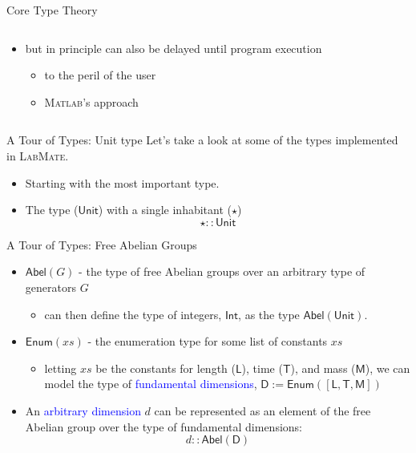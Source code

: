 \documentclass[]{beamer}
\newcommand{\keyword}[1]{\textcolor{blue}{#1}}
\newcommand{\lr}{\textsc{LabMate}}
\newcommand{\ma}{\textsc{Matlab}}
\newcommand{\Unit}{\mathsf{Unit}}
\newcommand{\Abel}{\mathsf{Abel}}
\newcommand{\Int}{\mathsf{Int}}
\newcommand{\Enum}{\mathsf{Enum}}
\newcommand{\LL}{\mathsf{L}}
\newcommand{\TT}{\mathsf{T}}
\newcommand{\MM}{\mathsf{M}}
\begin{document}
\begin{frame}{Core Type Theory}
\begin{columns}
\begin{column}{0.55\textwidth}
\begin{itemize}[<+->]
\begin{itemize}
        \item \lr{}'s approach
      \end{itemize}
      \item but in principle can also be delayed until program execution
      \begin{itemize}
        \item to the peril of the user
        \item \ma{}'s approach
      \end{itemize}
    \end{itemize}
  \end{column}
\end{columns}
\end{frame}

\begin{frame}{A Tour of Types: Unit type}
Let's take a look at some of the types implemented in \lr{}.\pause \\
\begin{itemize}[<+->]
  \item Starting with the most important type.
  \item The type ($\Unit$) with a single inhabitant ($\star$)
  \[\star :: \Unit\]
\end{itemize}
\end{frame}

\begin{frame}{A Tour of Types: Free Abelian Groups}
\begin{itemize}[<+->]
  \item $\Abel(G)$ - the type of free Abelian groups over an arbitrary type of generators $G$
  \begin{itemize}
    \item can then define the type of integers, $\Int$, as the type $\Abel(\Unit)$.
  \end{itemize}
  \item $\Enum(xs)$ - the enumeration type for some list of constants $xs$
  \begin{itemize}
    \item letting $xs$ be the constants for length ($\LL$), time ($\TT$), and mass ($\MM$), we can model the type of \keyword{fundamental dimensions}, $\mathsf{D} := \Enum([\LL, \TT, \MM])$
  \end{itemize}
  \item An \keyword{arbitrary dimension} $d$ can be represented as an element of the free Abelian group over the type of fundamental dimensions:
  \[d :: \Abel(\mathsf{D})\]
\end{itemize}
\end{frame}
\end{document}
